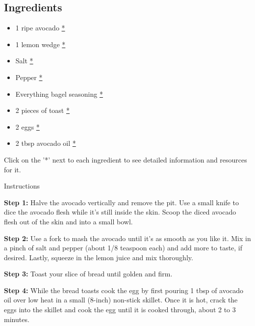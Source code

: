 \documentclass[
]{book}
\providecommand{\tightlist}{%
  \setlength{\itemsep}{0pt}\setlength{\parskip}{0pt}}
\begin{document}
\subsection*{Ingredients}\label{ingredients}

\begin{itemize}
\tightlist
\item
  1 ripe avocado
  \href{https://www.publix.com/pd/hass-avocados/RIO-PCI-107578?origin=search1}{*}
\item
  1 lemon wedge
  \href{https://www.publix.com/pd/lemons/RIO-PCI-107591?origin=search1}{*}
\item
  Salt
  \href{https://www.publix.com/pd/morton-salt/RIO-PCI-103677?origin=search9}{*}
\item
  Pepper
  \href{https://www.publix.com/pd/publix-black-pepper-ground/RIO-PCI-110488?origin=search1}{*}
\item
  Everything bagel seasoning
  \href{https://www.publix.com/pd/badia-everything-bagel/RIO-PCI-572577?origin=search1}{*}
\item
  2 pieces of toast
  \href{https://www.publix.com/pd/natures-own-honey-wheat-sandwich-bread-20-oz-loaf/RIO-PCI-144911?origin=search1}{*}
\item
  2 eggs
  \href{https://www.publix.com/pd/publix-eggs-large/RIO-PCI-145492?origin=search8}{*}
\item
  2 tbsp avocado oil
  \href{https://www.publix.com/pd/publix-avocado-oil/RIO-PCI-575036?origin=search1}{*}
\end{itemize}

Click on the '*' next to each ingredient to see detailed information and
resources for it.

Instructions

\textbf{Step 1:} Halve the avocado vertically and remove the pit. Use a
small knife to dice the avocado flesh while it's still inside the skin.
Scoop the diced avocado flesh out of the skin and into a small bowl.

\textbf{Step 2:} Use a fork to mash the avocado until it's as smooth as
you like it. Mix in a pinch of salt and pepper (about 1/8 teaspoon each)
and add more to taste, if desired. Lastly, squeeze in the lemon juice
and mix thoroughly.

\textbf{Step 3:} Toast your slice of bread until golden and firm.

\textbf{Step 4:} While the bread toasts cook the egg by first pouring 1
tbsp of avocado oil over low heat in a small (8-inch) non-stick skillet.
Once it is hot, crack the eggs into the skillet and cook the egg until
it is cooked through, about 2 to 3 minutes.
\end{document}
